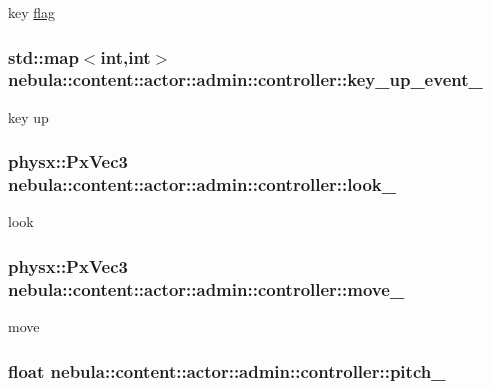 key \hyperlink{structnebula_1_1content_1_1actor_1_1admin_1_1controller_1_1flag}{flag} \hypertarget{classnebula_1_1content_1_1actor_1_1admin_1_1controller_ae73445e6b5a6219360b94348939ae531}{
\subsubsection[{key\_\-up\_\-event\_\-}]{\setlength{\rightskip}{0pt plus 5cm}std::map$<$int,int$>$ {\bf nebula::content::actor::admin::controller::key\_\-up\_\-event\_\-}}}
\label{classnebula_1_1content_1_1actor_1_1admin_1_1controller_ae73445e6b5a6219360b94348939ae531}


key up \hypertarget{classnebula_1_1content_1_1actor_1_1admin_1_1controller_a2759f6005029cb9b0480f0b3d9b4d2f8}{
\subsubsection[{look\_\-}]{\setlength{\rightskip}{0pt plus 5cm}physx::PxVec3 {\bf nebula::content::actor::admin::controller::look\_\-}}}
\label{classnebula_1_1content_1_1actor_1_1admin_1_1controller_a2759f6005029cb9b0480f0b3d9b4d2f8}


look \hypertarget{classnebula_1_1content_1_1actor_1_1admin_1_1controller_aa2e924d116a8af2af378cd37816eb899}{
\subsubsection[{move\_\-}]{\setlength{\rightskip}{0pt plus 5cm}physx::PxVec3 {\bf nebula::content::actor::admin::controller::move\_\-}}}
\label{classnebula_1_1content_1_1actor_1_1admin_1_1controller_aa2e924d116a8af2af378cd37816eb899}


move \hypertarget{classnebula_1_1content_1_1actor_1_1admin_1_1controller_a42a295e189c869f3edf4a6131adbc700}{
\subsubsection[{pitch\_\-}]{\setlength{\rightskip}{0pt plus 5cm}float {\bf nebula::content::actor::admin::controller::pitch\_\-}}}
\label{classnebula_1_1content_1_1actor_1_1admin_1_1controller_a42a295e189c869f3edf4a6131adbc700}


